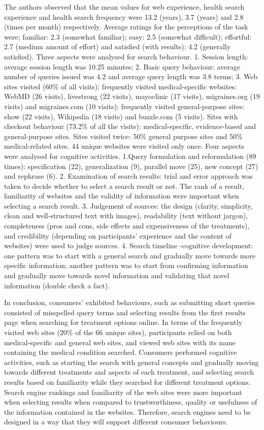 \documentclass[]{article}
\begin{document}
The authors observed that the mean values for web experience, health search experience and health search frequency were 13.2 (years), 3.7 (years) and 2.8 (times per month) respectively. Average ratings for the perceptions of the task were; familiar: 2.3 (somewhat familiar); easy: 2.5 (somewhat difficult); effortful: 2.7 (medium amount of effort) and satisfied (with results): 4.2 (generally satisfied). Three aspects were analysed for search behaviour. 1. Session length: average session length was 10.25 minutes; 2. Basic query behaviour: average number of queries issued was 4.2 and average query length was 3.8 terms; 3. Web sites visited (60\% of all visits): frequently visited medical-specific websites: WebMD (26 visits), livestrong (22 visits), mayoclinic (17 visits), migraines.org (19 visits) and migraines.com (10 visits); frequently visited general-purpose sites:  ehow (22 visits), Wikipedia (18 visits) and buzzle.com (5 visits). Sites with checkout behaviour (73.2\% of all the visits): medical-specific, evidence-based and general-purpose sites. Sites visited twice: 50\% general purpose sites and 50\% medical-related sites. 44 unique websites were visited only once. Four aspects were analysed for cognitive activities. 1.Query formulation and reformulation (89 times): specification (22), generalization (9), parallel move (25), new concept (27) and rephrase (6). 2. Examination of search results: trial and error approach was taken to decide whether to select a search result or not. The rank of a result, familiarity of websites and the validity of information were important when selecting a search result. 3. Judgement of sources: the design (clarity, simplicity, clean and well-structured text with images), readability (text without jargon), completeness (pros and cons, side effects and expensiveness of the treatments), and credibility (depending on participants' experience and the content of websites) were used to judge sources. 4. Search timeline -cognitive development: one pattern was to start with a general search and gradually move towards more specific information; another pattern was to start from confirming information and gradually move towards novel information and validating that novel information (double check a fact).

In conclusion, consumers' exhibited behaviours, such as submitting short queries consisted of misspelled query terms and selecting results from the first results page when searching for treatment options online. In terms of the frequently visited web sites (20\% of the 66 unique sites), participants relied on both medical-specific and general web sites, and viewed web sites with its name containing the medical condition searched. Consumers performed cognitive activities, such as starting the search with general concepts and gradually moving towards different treatments and aspects of each treatment, and selecting search results based on familiarity while they searched for different treatment options. Search engine rankings and familiarity of the web sites were more important when selecting results when compared to trustworthiness, quality or usefulness of the information contained in the websites. Therefore, search engines need to be designed in a way that they will support different consumer behaviours.  
\end{document}
